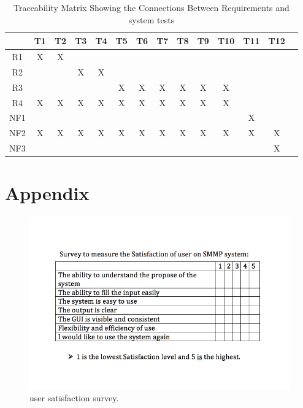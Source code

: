 \documentclass[12pt, titlepage]{article}
\begin{document}
\begin{table}[h!]
\centering
\begin{tabular}{|c|c|c|c|c|c|c|c|c|c|c|c|c|c|}
\hline
	& T1 & T2 & T3 & T4 & T5 & T6 & T7 &T8  & T9 & T10 & T11 & T12  \\
\hline
R1  & X& X& & & & & & &  & & &  \\ \hline
R2  & & & X& X& & & & &  & & &  \\ \hline
R3  & & & & &X &X&X & X &X &X & &  \\ \hline
R4  &X & X& X& X&X &X&X & X & X& X& & \\ \hline
NF1 & & & & & & & & &  & &X &  \\ \hline
NF2   & X& X& X&X & X& X& X&X & X &X & X& X \\ \hline
NF3   & & & & & & & & &  & & & X  \\ \hline
\hline
\end{tabular}
\caption{Traceability Matrix Showing the Connections Between Requirements and system tests}
\label{tab:reqtrace}
\end{table}
\newpage




\newpage

\section{Appendix}
 \begin{figure}[h!]
 \begin{center}
 \includegraphics [width=\textwidth]{survey}
 \caption{\label{ Figure 1:} user satisfaction survey.}
 \end{center}
 \end{figure}
\end{document}
